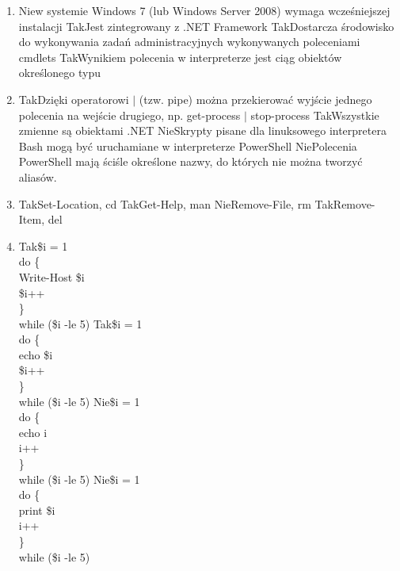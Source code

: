 \begin{enumerate}
		\newpage
		\item {}%
		{Nie}{w systemie Windows 7 (lub Windows Server 2008) wymaga wcześniejszej instalacji}%
		{Tak}{Jest zintegrowany z .NET Framework}%
		{Tak}{Dostarcza środowisko do wykonywania zadań administracyjnych wykonywanych poleceniami cmdlets}%
		{Tak}{Wynikiem polecenia w interpreterze jest ciąg obiektów określonego typu}
		\item {}%
		{Tak}{Dzięki operatorowi $ \mid $ (tzw. pipe) można przekierować wyjście jednego polecenia na wejście drugiego, np. get-process $ \mid $ stop-process}%
		{Tak}{Wszystkie zmienne są obiektami .NET}%
		{Nie}{Skrypty pisane dla linuksowego interpretera Bash mogą być uruchamiane w interpreterze PowerShell}%
		{Nie}{Polecenia PowerShell mają ściśle określone nazwy, do których nie można tworzyć aliasów.}
		\item {}%
		{Tak}{Set-Location, cd}%
		{Tak}{Get-Help, man}%
		{Nie}{Remove-File, rm}%
		{Tak}{Remove-Item, del}
		\item {}%
		{Tak}{\$i = 1\\
			do \{\\
				Write-Host \$i\\
				\$i++\\
			\}\\
			while (\$i -le 5)}%
		{Tak}{\$i = 1\\
			do \{\\
				echo \$i\\
				\$i++\\
			\}\\
			while (\$i -le 5)}%
		{Nie}{\$i = 1\\
			do \{\\
				echo i\\
				i++\\
			\}\\
			while (\$i -le 5)}%
		{Nie}{\$i = 1\\
			do \{\\
				print \$i\\
				i++\\
			\}\\
			while (\$i -le 5)}
		

\end{enumerate}
